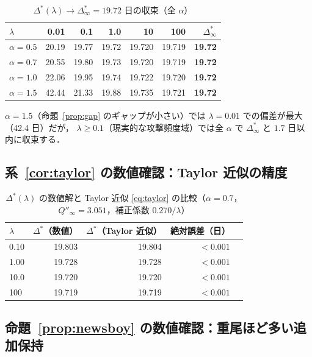 \documentclass[12pt,a4paper]{article}
\theoremstyle{plain}
\theoremstyle{definition}
\theoremstyle{remark}
\newcommand{\Dopt}{\Delta^{*}}
\newcommand{\Dinf}{\Delta^{*}_{\infty}}
\begin{document}
\begin{table}[H]
\centering
\caption{$\Dopt(\lambda)\to\Dinf=19.72$ 日の収束（全 $\alpha$）}
\label{tab:convergence}
\begin{tabular}{@{}lrrrrrr@{}}
\toprule
$\lambda$ & 0.01 & 0.1 & 1.0 & 10 & 100 & $\Dinf$ \\
\midrule
$\alpha=0.5$ & 20.19 & 19.77 & 19.72 & 19.720 & 19.719 & \textbf{19.72} \\
$\alpha=0.7$ & 20.55 & 19.80 & 19.73 & 19.720 & 19.719 & \textbf{19.72} \\
$\alpha=1.0$ & 22.06 & 19.95 & 19.74 & 19.722 & 19.720 & \textbf{19.72} \\
$\alpha=1.5$ & 42.44 & 21.33 & 19.88 & 19.735 & 19.721 & \textbf{19.72} \\
\bottomrule
\end{tabular}
\end{table}

$\alpha=1.5$（命題~\ref{prop:gap} のギャップが小さい）では $\lambda=0.01$ での偏差が最大（42.4 日）だが，
$\lambda\ge0.1$（現実的な攻撃頻度域）では全 $\alpha$ で $\Dinf$ と $1.7$ 日以内に収束する．

\subsection{系~\ref{cor:taylor} の数値確認：Taylor 近似の精度}

\begin{table}[H]
\centering
\caption{$\Dopt(\lambda)$ の数値解と Taylor 近似 \eqref{eq:taylor} の比較（$\alpha=0.7$，
$Q''_\infty=3.051$，補正係数 $0.270/\lambda$）}
\label{tab:taylor}
\begin{tabular}{@{}lrrrr@{}}
\toprule
$\lambda$ & $\Dopt$（数値）& $\Dopt$（Taylor 近似）& 絶対誤差（日）\\
\midrule
0.10 & 19.803 & 19.804 & $<0.001$ \\
1.00 & 19.728 & 19.728 & $<0.001$ \\
10.0 & 19.720 & 19.720 & $<0.001$ \\
100  & 19.719 & 19.719 & $<0.001$ \\
\bottomrule
\end{tabular}
\end{table}

\subsection{命題~\ref{prop:newsboy} の数値確認：重尾ほど多い追加保持}
\end{document}
